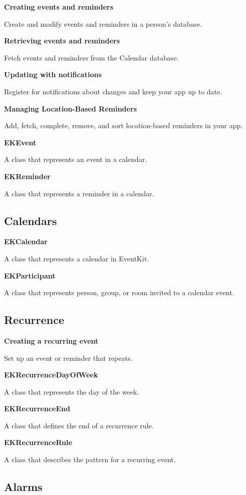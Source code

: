 \documentclass{article}
\begin{document}
\textbf{Creating events and reminders}

Create and modify events and reminders in a person's database.

\textbf{Retrieving events and reminders}

Fetch events and reminders from the Calendar database.

\textbf{Updating with notifications}

Register for notifications about changes and keep your app up to date.

\textbf{Managing Location-Based Reminders}

Add, fetch, complete, remove, and sort location-based reminders in your app.

\textbf{EKEvent}

A class that represents an event in a calendar.

\textbf{EKReminder}

A class that represents a reminder in a calendar.

\subsection*{Calendars}

\textbf{EKCalendar}

A class that represents a calendar in EventKit.

\textbf{EKParticipant}

A class that represents person, group, or room invited to a calendar event.

\subsection*{Recurrence}

\textbf{Creating a recurring event}

Set up an event or reminder that repeats.

\textbf{EKRecurrenceDayOfWeek}

A class that represents the day of the week.

\textbf{EKRecurrenceEnd}

A class that defines the end of a recurrence rule.

\textbf{EKRecurrenceRule}

A class that describes the pattern for a recurring event.

\subsection*{Alarms}
\end{document}
